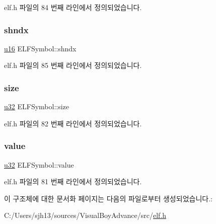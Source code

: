 elf.\+h 파일의 84 번째 라인에서 정의되었습니다.

\mbox{\label{struct_e_l_f_symbol_a66f166eed1f7e96da9bfdc8cee7d887d}} 
\subsubsection{\texorpdfstring{shndx}{shndx}}
{\footnotesize\ttfamily \mbox{\hyperlink{_system_8h_a9e6c91d77e24643b888dbd1a1a590054}{u16}} E\+L\+F\+Symbol\+::shndx}



elf.\+h 파일의 85 번째 라인에서 정의되었습니다.

\mbox{\label{struct_e_l_f_symbol_a40bb6453d115f04dc63227dd6da7611f}} 
\subsubsection{\texorpdfstring{size}{size}}
{\footnotesize\ttfamily \mbox{\hyperlink{_system_8h_a10e94b422ef0c20dcdec20d31a1f5049}{u32}} E\+L\+F\+Symbol\+::size}



elf.\+h 파일의 82 번째 라인에서 정의되었습니다.

\mbox{\label{struct_e_l_f_symbol_ab2da134d25fef0ac7b83c49a5d0ada6c}} 
\subsubsection{\texorpdfstring{value}{value}}
{\footnotesize\ttfamily \mbox{\hyperlink{_system_8h_a10e94b422ef0c20dcdec20d31a1f5049}{u32}} E\+L\+F\+Symbol\+::value}



elf.\+h 파일의 81 번째 라인에서 정의되었습니다.



이 구조체에 대한 문서화 페이지는 다음의 파일로부터 생성되었습니다.\+:\begin{DoxyCompactItemize}
\item 
C\+:/\+Users/sjh13/sources/\+Visual\+Boy\+Advance/src/\mbox{\hyperlink{elf_8h}{elf.\+h}}\end{DoxyCompactItemize}
